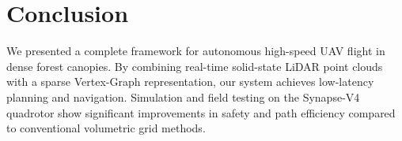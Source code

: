 \section{Conclusion}
We presented a complete framework for autonomous high-speed UAV flight in dense forest canopies. By combining real-time solid-state LiDAR point clouds with a sparse Vertex-Graph representation, our system achieves low-latency planning and navigation. Simulation and field testing on the Synapse-V4 quadrotor show significant improvements in safety and path efficiency compared to conventional volumetric grid methods.
